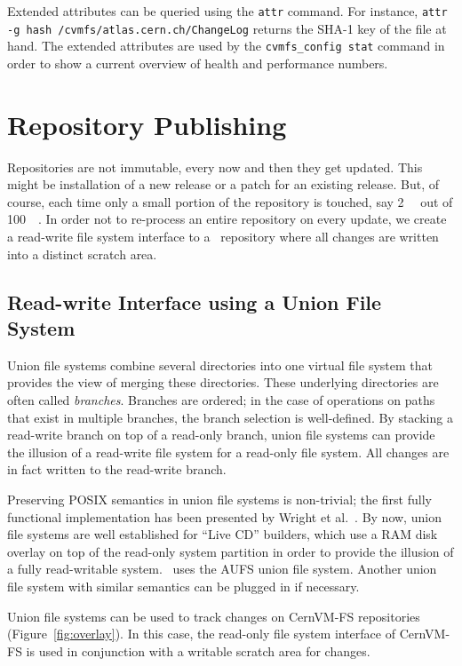 Extended attributes can be queried using the \texttt{attr} command.
For instance, \texttt{attr -g hash /cvmfs/atlas.cern.ch/ChangeLog} returns the SHA-1 key of the file at hand.
The extended attributes are used by the \texttt{cvmfs\_config stat} command in order to show a current overview of health and performance numbers.


\section{Repository Publishing}

Repositories are not immutable, every now and then they get updated. 
This might be installation of a new release or a patch for an existing release.  
But, of course, each time only a small portion of the repository is touched, say \SI{2}{\giga\byte} out of \SI{100}{\giga\byte}.
In order not to re-process an entire repository on every update, we create a read-write file system interface to a \cvmfs\ repository where all changes are written into a distinct scratch area.

\subsection{Read-write Interface using a Union File System}
Union file systems combine several directories into one virtual file system that provides the view of merging these directories.
These underlying directories are often called \emph{branches}.
Branches are ordered; in the case of operations on paths that exist in multiple branches, the branch selection is well-defined.
By stacking a read-write branch on top of a read-only branch, union file systems can provide the illusion of a read-write file system for a read-only file system.
All changes are in fact written to the read-write branch.

Preserving POSIX semantics in union file systems is non-trivial; the first fully functional implementation has been presented by Wright et al.~\cite{unionfs04}.
By now, union file systems are well established for ``Live CD'' builders, which use a RAM disk overlay on top of the read-only system partition in order to provide the illusion of a fully read-writable system.
\cvmfs\ uses the AUFS union file system.
Another union file system with similar semantics can be plugged in if necessary.

Union file systems can be used to track changes on CernVM-FS repositories (Figure~\ref{fig:overlay}).
In this case, the read-only file system interface of CernVM-FS is used in conjunction with a writable scratch area for changes.

